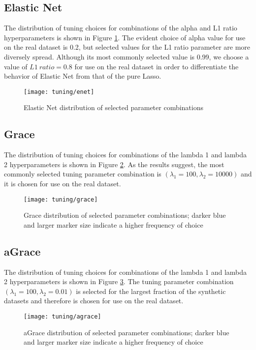 \pagebreak

\subsection{Elastic Net}
The distribution of tuning choices for combinations of the alpha and L1 ratio hyperparameters is shown in Figure \ref{fig:tun_enet}. The evident choice of alpha value for use on the real dataset is 0.2, but selected values for the L1 ratio parameter are more diversely spread. Although its most commonly selected value is 0.99, we choose a value of $L1\ ratio = 0.8$ for use on the real dataset in order to differentiate the behavior of Elastic Net from that of the pure Lasso.
\begin{figure}[H]
	\centering
	\texttt{[image: tuning/enet]}
	\caption{Elastic Net distribution of selected parameter combinations}
	\label{fig:tun_enet}
\end{figure}

\pagebreak

\subsection{Grace}
The distribution of tuning choices for combinations of the lambda 1 and lambda 2 hyperparameters is shown in Figure \ref{fig:tun_grace}. As the results suggest, the most commonly selected tuning parameter combination is $(\lambda_1=100,\lambda_2=10000)$ and it is chosen for use on the real dataset.
\begin{figure}[H]
	\centering
	\texttt{[image: tuning/grace]}
	\caption{Grace distribution of selected parameter combinations; darker blue and larger marker size indicate a higher frequency of choice}
	\label{fig:tun_grace}
\end{figure}

\pagebreak

\subsection{aGrace}
The distribution of tuning choices for combinations of the lambda 1 and lambda 2 hyperparameters is shown in Figure \ref{fig:tun_agrace}. The tuning parameter combination $(\lambda_1=100,\lambda_2=0.01)$ is selected for the largest fraction of the synthetic datasets and therefore is chosen for use on the real dataset.
\begin{figure}[H]
	\centering
	\texttt{[image: tuning/agrace]}
	\caption{aGrace distribution of selected parameter combinations; darker blue and larger marker size indicate a higher frequency of choice}
	\label{fig:tun_agrace}
\end{figure}

